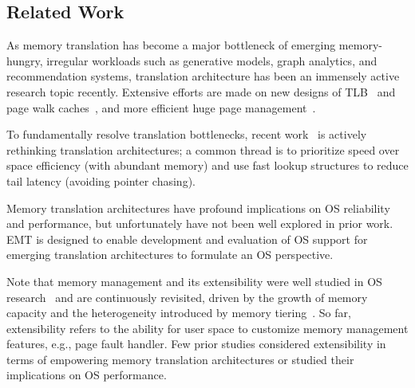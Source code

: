 \subsection{Related Work}
\label{emt:sec:related}

\noindent
As memory translation has become a major bottleneck of emerging memory-hungry, irregular 
    workloads such as generative models, graph analytics,
    and recommendation systems,
    translation architecture has been an immensely active 
    research topic recently.
Extensive efforts are made on new designs of
    TLB~\cite{pham2012colt,pham2014increasing,park2017hybrid,barr2011spectlb} 
    and page walk caches~\cite{barr2010translation,bhattacharjee2013lmm},
    and more efficient huge page management~\cite{panwar2018making,navarro2002practical,kwon2016coordinated,panwar2019hawkeye,jia:pact:23}.

To fundamentally resolve translation bottlenecks, 
    recent work~\cite{skarlatos2020ecpt,kanellopoulos2023utopia,gupta2021midgard,yaniv2016hash,gosakan2023mosaic} 
    is actively rethinking translation architectures;
    a common thread is to prioritize speed over space efficiency (with abundant memory)
    and use fast lookup structures to reduce tail latency (avoiding pointer chasing).

%
Memory translation architectures have profound implications on OS reliability and performance,
    but unfortunately have not been well explored in prior work.
EMT is designed to enable development and evaluation of OS support for emerging translation architectures
    to formulate an OS perspective.

Note that memory management and its extensibility were well
    studied in OS research~\cite{krueger1993tools,rashid1987machine,abrossimov1989generic,engler1995avm,bershad1995extensibility}
    and are continuously revisited, driven by the growth 
    of memory capacity and the heterogeneity introduced by memory tiering~\cite{Tabatabai2024,Raybuck2021,Jalalian2024,li2023pond,maruf2023tpp,Bergman2022}.
So far, extensibility refers to the ability for user space 
    to customize memory management features, e.g., page fault handler.
Few prior studies considered extensibility in terms of empowering 
    memory translation architectures
    or studied their implications on OS performance.

